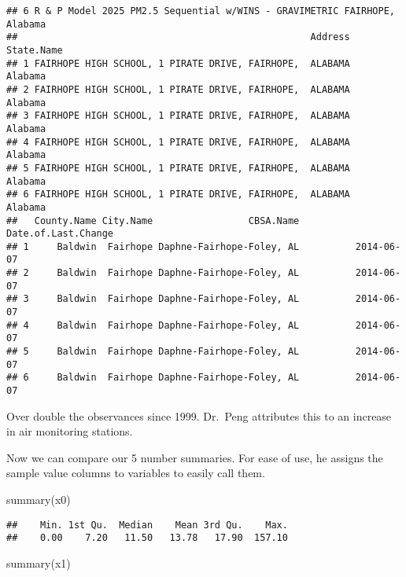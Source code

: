 \documentclass[
]{article}
\newenvironment{Shaded}{\begin{snugshade}}{\end{snugshade}}
\newcommand{\FunctionTok}[1]{\textcolor[rgb]{0.00,0.00,0.00}{#1}}
\newcommand{\NormalTok}[1]{#1}
\newcommand{\OtherTok}[1]{\textcolor[rgb]{0.56,0.35,0.01}{#1}}
\newcommand{\SpecialCharTok}[1]{\textcolor[rgb]{0.00,0.00,0.00}{#1}}
\begin{document}
\begin{verbatim}
## 6 R & P Model 2025 PM2.5 Sequential w/WINS - GRAVIMETRIC FAIRHOPE, Alabama
##                                                    Address State.Name
## 1 FAIRHOPE HIGH SCHOOL, 1 PIRATE DRIVE, FAIRHOPE,  ALABAMA    Alabama
## 2 FAIRHOPE HIGH SCHOOL, 1 PIRATE DRIVE, FAIRHOPE,  ALABAMA    Alabama
## 3 FAIRHOPE HIGH SCHOOL, 1 PIRATE DRIVE, FAIRHOPE,  ALABAMA    Alabama
## 4 FAIRHOPE HIGH SCHOOL, 1 PIRATE DRIVE, FAIRHOPE,  ALABAMA    Alabama
## 5 FAIRHOPE HIGH SCHOOL, 1 PIRATE DRIVE, FAIRHOPE,  ALABAMA    Alabama
## 6 FAIRHOPE HIGH SCHOOL, 1 PIRATE DRIVE, FAIRHOPE,  ALABAMA    Alabama
##   County.Name City.Name                 CBSA.Name Date.of.Last.Change
## 1     Baldwin  Fairhope Daphne-Fairhope-Foley, AL          2014-06-07
## 2     Baldwin  Fairhope Daphne-Fairhope-Foley, AL          2014-06-07
## 3     Baldwin  Fairhope Daphne-Fairhope-Foley, AL          2014-06-07
## 4     Baldwin  Fairhope Daphne-Fairhope-Foley, AL          2014-06-07
## 5     Baldwin  Fairhope Daphne-Fairhope-Foley, AL          2014-06-07
## 6     Baldwin  Fairhope Daphne-Fairhope-Foley, AL          2014-06-07
\end{verbatim}

Over double the observances since 1999. Dr.~Peng attributes this to an
increase in air monitoring stations.

Now we can compare our 5 number summaries. For ease of use, he assigns
the sample value columns to variables to easily call them.

\begin{Shaded}
\end{Shaded}

\begin{Shaded}
\begin{Highlighting}[]
\FunctionTok{summary}\NormalTok{(x0)}
\end{Highlighting}
\end{Shaded}

\begin{verbatim}
##    Min. 1st Qu.  Median    Mean 3rd Qu.    Max. 
##    0.00    7.20   11.50   13.78   17.90  157.10
\end{verbatim}

\begin{Shaded}
\begin{Highlighting}[]
\FunctionTok{summary}\NormalTok{(x1)}
\end{Highlighting}
\end{Shaded}
\end{document}
